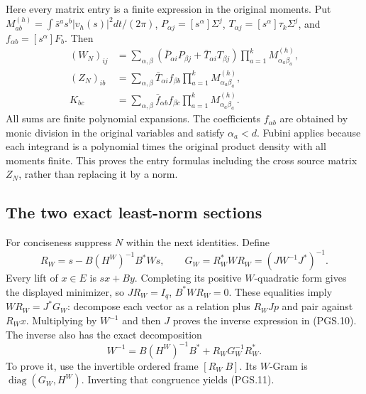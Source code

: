 Here every matrix entry is a finite expression in the original moments.
Put \(M^{(h)}_{ab}=\int\bar s^a s^b|v_h(s)|^2dt/(2\pi)\),
\(P_{\alpha j}=[s^\alpha]\Sigma^j\),
\(T_{\alpha j}=[s^\alpha]\tau_k\Sigma^j\), and
\(f_{\alpha b}=[s^\alpha]F_b\). Then
\[
\begin{aligned}
 (W_N)_{ij}
 &=\sum_{\alpha,\beta}
  (\bar P_{\alpha i}P_{\beta j}
       +\bar T_{\alpha i}T_{\beta j})
             \prod_{a=1}^k M^{(h)}_{\alpha_a\beta_a},\\
 (Z_N)_{ib}
 &=\sum_{\alpha,\beta}\bar T_{\alpha i}f_{\beta b}
             \prod_{a=1}^k M^{(h)}_{\alpha_a\beta_a},\\
 K_{bc}&=\sum_{\alpha,\beta}\bar f_{\alpha b}f_{\beta c}
             \prod_{a=1}^k M^{(h)}_{\alpha_a\beta_a}.
\end{aligned}
\tag{PGS.9}\label{eq:pgs-entries}
\]
All sums are finite polynomial expansions. The coefficients
\(f_{\alpha b}\) are obtained by monic division in the original
variables and satisfy \(\alpha_a<d\). Fubini applies because
each integrand is a polynomial times the original product density
with all moments finite. This proves the entry formulas including
the cross source matrix \(Z_N\), rather than replacing it by a norm.

\subsection{The two exact least-norm sections}

For conciseness suppress \(N\) within the next identities. Define
\[
 R_W=s-B(H^W)^{-1}B^*Ws,\qquad
 G_W=R_W^*WR_W=(JW^{-1}J^*)^{-1}.
\tag{PGS.10}\label{eq:pgs-weight-section}
\]
Every lift of \(x\in E\) is \(sx+By\). Completing its positive
\(W\)-quadratic form gives the displayed minimizer, so
\(JR_W=I_q\), \(B^*WR_W=0\). These equalities imply
\(WR_W=J^*G_W\): decompose each vector as a relation plus
\(R_WJp\) and pair against \(R_Wx\). Multiplying by \(W^{-1}\)
and then \(J\) proves the inverse expression in (PGS.10).
The inverse also has the exact decomposition
\[
 W^{-1}=B(H^W)^{-1}B^*+R_WG_W^{-1}R_W^*.
\tag{PGS.11}\label{eq:pgs-inverse-decomposition}
\]
To prove it, use the invertible ordered frame \([R_W\ B]\).
Its \(W\)-Gram is \(\operatorname{diag}(G_W,H^W)\).
Inverting that congruence yields (PGS.11).

